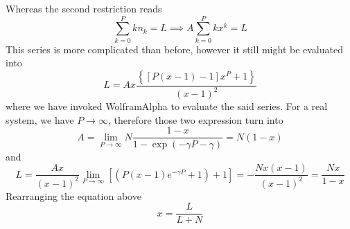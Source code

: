 \documentclass[../../../Main.tex]{subfiles}
\begin{document}
Whereas the second restriction reads
\begin{equation*}
    \sum_{k=0}^{P}kn_k=L\implies A\sum_{k=0}^{P}kx^k=L
\end{equation*}
This series is more complicated than before, however it still might be evaluated into 
\begin{equation*}
    L=Ax\frac{\left\{\left[P\left(x-1\right)-1\right]x^P+1\right\}}{(x-1)^2}
\end{equation*}  
where we have invoked WolframAlpha to evaluate the said series. For a real\textsuperscript{\texttrademark} system, we have $P\rightarrow\infty $, therefore those two expression turn into
\begin{equation*}
    A=\lim_{P\rightarrow\infty}N\frac{1-x}{1-\exp (-\gamma P-\gamma)}=N(1-x)
\end{equation*}  
and
\begin{equation*} 
    L=\frac{Ax}{(x-1)^2}\lim_{P\rightarrow\infty}\left[(P(x-1)e^{-\gamma P}+1)+1\right]=-\frac{Nx(x-1)}{(x-1)^2}=\frac{Nx}{1-x}
\end{equation*}
Rearranging the equation above 
\begin{equation*}
    x=\frac{L}{L+N}
\end{equation*}
\end{document}
